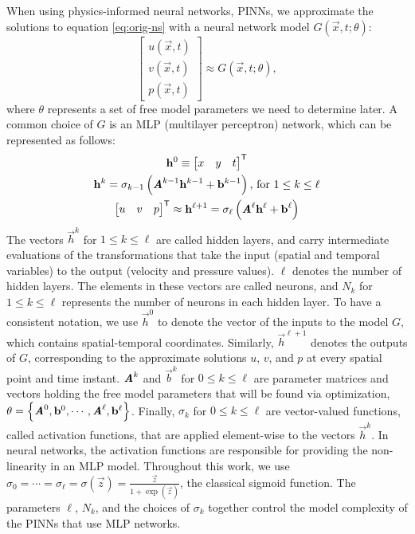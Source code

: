 When using physics-informed neural networks, PINNs, we approximate the solutions to equation \eqref{eq:orig-ns} with a neural network model $G(\vec{x}, t; \theta)$:
\begin{equation}\label{eq:G-network}
    \begin{bmatrix}
        u(\vec{x}, t) \\ v(\vec{x}, t) \\ p(\vec{x}, t)
    \end{bmatrix}
    \approx
    G(\vec{x}, t; \theta),
\end{equation}
where $\theta$ represents a set of free model parameters we need to determine later.
A common choice of $G$ is an MLP (multilayer perceptron) network, which can be represented as follows:
\begin{gather}\label{eq:mlp-formula}
    \mathbf{h}^0 \equiv \begin{bmatrix} x & y & t \end{bmatrix}^\mathsf{T} \\
    \mathbf{h}^k =
        \sigma_{k-1}\left(\boldsymbol{\mathit{A}}^{k-1}\mathbf{h}^{k-1}+\mathbf{b}^{k-1}\right)
        \text{, for } 1 \le k \le \ell \\
    \begin{bmatrix} u & v & p \end{bmatrix}^\mathsf{T}
        \approx
        \mathbf{h}^{\ell+1} = \sigma_\ell\left(\boldsymbol{\mathit{A}}^\ell\mathbf{h}^\ell+\mathbf{b}^\ell\right)
\end{gather}
The vectors $\vec{h}^k$ for $1 \le k \le \ell$ are called hidden layers, and carry intermediate evaluations of the transformations that take the input (spatial and temporal variables) to the output (velocity and pressure values).
$\ell$ denotes the number of hidden layers.
The elements in these vectors are called neurons, and $N_k$ for $1 \le k \le \ell$ represents the number of neurons in each hidden layer.
To have a consistent notation, we use $\vec{h}^0$ to denote the vector of the inputs to the model $G$, which contains spatial-temporal coordinates.
Similarly, $\vec{h}^{\ell+1}$ denotes the outputs of $G$, corresponding to the approximate solutions $u$, $v$, and $p$ at every spatial point and time instant. 
$\boldsymbol{\mathit{A}}^k$ and $\vec{b}^k$ for $0 \le k \le \ell$ are parameter matrices and vectors holding the free model parameters that will be found via optimization, 
$\theta = \left\{ \boldsymbol{\mathit{A}}^0, \mathbf{b}^0, \cdots, \boldsymbol{\mathit{A}}^\ell, \mathbf{b}^\ell\right\}$.
Finally, $\sigma_k$ for $0 \le k \le \ell$ are vector-valued functions, called activation functions, that are applied element-wise to the vectors $\vec{h}^k$.
In neural networks, the activation functions are responsible for providing the non-linearity in an MLP model.
Throughout this work, we use $\sigma_0 = \cdots = \sigma_\ell = \sigma(\vec{z}) = \frac{\vec{z}}{1 + \exp(\vec{z})}$, the classical sigmoid function.
The parameters $\ell$, $N_k$, and the choices of $\sigma_k$ together control the model complexity of the PINNs that use MLP networks.

